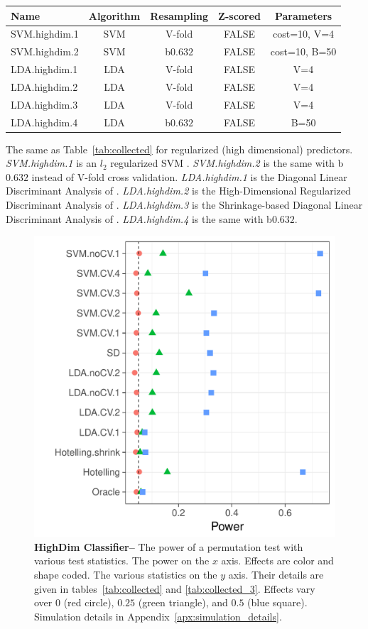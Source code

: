 \documentclass[12pt,a4paper]{article}
\begin{document}
\bigskip

\begin{tcolorbox}
\centering
\begin{tabular}{l|c|c|c|c}
Name & Algorithm & Resampling & Z-scored & Parameters\\ 
\hline
\hline
SVM.highdim.1 & SVM & V-fold & FALSE & cost=10, V=4 \\ 
SVM.highdim.2 & SVM & b$0.632$ & FALSE & cost=10, B=50 \\ 
LDA.highdim.1 & LDA & V-fold & FALSE & V=4 \\ 
LDA.highdim.2 & LDA & V-fold & FALSE & V=4 \\ 
LDA.highdim.3 & LDA & V-fold & FALSE & V=4 \\ 
LDA.highdim.4 & LDA & b$0.632$ & FALSE & B=50 \\ 
\end{tabular} 
\captionsetup{type=table}
\caption{
The same as Table~\ref{tab:collected} for regularized (high dimensional) predictors. 
\emph{SVM.highdim.1} is an $l_2$ regularized SVM \citep{friedman_regularization_2010}. 
\emph{SVM.highdim.2} is the same with b$0.632$ instead of V-fold cross validation. 
\emph{LDA.highdim.1} is the Diagonal Linear Discriminant Analysis of \cite{dudoit_comparison_2002}.
\emph{LDA.highdim.2} is the High-Dimensional Regularized Discriminant Analysis of \cite{ramey_high-dimensional_2016}.
\emph{LDA.highdim.3} is the Shrinkage-based Diagonal Linear Discriminant Analysis of \cite{pang_shrinkage-based_2009}.
\emph{LDA.highdim.4} is the same with b$0.632$.
} 
\label{tab:collected_3}
\end{tcolorbox}


\begin{figure}[ht]
\centering
	  \includegraphics[width=0.7\linewidth]{"art/file14"}
	  \caption{
\textbf{HighDim Classifier--} 
		The power of a permutation test with various test statistics. 
		The power on the $x$ axis. 
		Effects are color and shape coded. 
		The various statistics on the $y$ axis. 
		Their details are given in tables~\ref{tab:collected} and \ref{tab:collected_3}. 
		Effects vary over $0$ (red circle), $0.25$ (green triangle), and $0.5$ (blue square). 
		Simulation details in Appendix~\ref{apx:simulation_details}.
} 
	\label{fig:highdim}
\end{figure}
\end{document}
